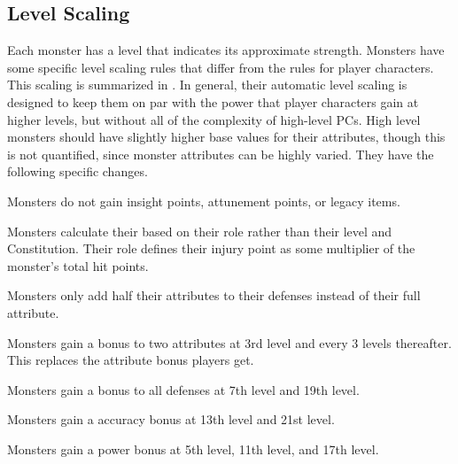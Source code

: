  \subsection{Level Scaling}
    Each monster has a level that indicates its approximate strength.
    Monsters have some specific level scaling rules that differ from the rules for player characters.
    This scaling is summarized in .
    In general, their automatic level scaling is designed to keep them on par with the power that player characters gain at higher levels, but without all of the complexity of high-level PCs.
    High level monsters should have slightly higher base values for their attributes, though this is not quantified, since monster attributes can be highly varied.
    They have the following specific changes.
    \begin{raggeditemize}
      \item Monsters do not gain insight points, attunement points, or legacy items.
      \item Monsters calculate their  based on their role rather than their level and Constitution.
        Their role defines their injury point as some multiplier of the monster's total hit points.
      \item Monsters only add half their attributes to their defenses instead of their full attribute.
      \item Monsters gain a  bonus to two attributes at 3rd level and every 3 levels thereafter.
        This replaces the attribute bonus players get.
      \item Monsters gain a  bonus to all defenses at 7th level and 19th level.
      \item Monsters gain a  accuracy bonus at 13th level and 21st level.
      \item Monsters gain a  power bonus at 5th level, 11th level, and 17th level.
    \end{raggeditemize}

